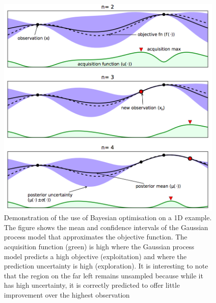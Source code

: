\documentclass[a4paper,11pt]{report}
\begin{document}
\begin{figure} [H]
	\label{BOdemonstration}
	\centering
	 \includegraphics[width=0.7\linewidth]{Bayesianoptimisation.png}
\caption{ Demonstration of the use of Bayesian optimisation on a 1D example. The figure shows  the mean and confidence intervals of the Gaussian process model that approximates the objective function. The acquisition function (green) is high where the Gaussian process model predicts a high objective (exploitation) and where the prediction uncertainty is high (exploration). It is interesting to note that the region on the far left remains unsampled because while it has high uncertainty, it is correctly predicted to offer little improvement over the highest observation \cite{brochu2010tutorial}  }
\end{figure}
\end{document}

